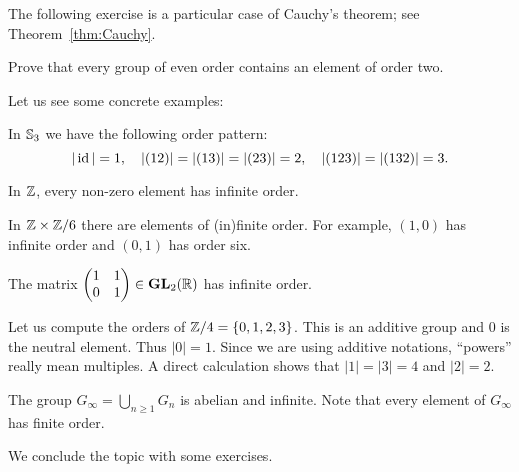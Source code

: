 The following exercise is a particular 
case of Cauchy's theorem; see Theorem~\ref{thm:Cauchy}. 

\begin{exercise}
        \label{xca:orden2}
        Prove that every group of even order contains
        an element of order two. 
\end{exercise}
                
Let us see some concrete examples: 

\begin{example}
        In $\mathbb{S}_3$ we have the following order pattern:
        \[
        |\operatorname{id}|=1,\quad
        |(12)|=|(13)|=|(23)|=2,\quad
        |(123)|=|(132)|=3.
        \]
\end{example}
                        
\begin{example}
        In $\mathbb{Z}$, every non-zero element has 
        infinite order. 
\end{example}
                        
 \begin{example}
        In $\mathbb{Z}\times\mathbb{Z}/6$ there are elements of 
        (in)finite order. For example, $(1,0)$ 
        has infinite order and 
        $(0,1)$ has order six. 
 \end{example}
                        
\begin{example}
        The matrix $\begin{pmatrix}1&1\\0&1\end{pmatrix}\in\mathbf{GL}_2(\mathbb{R})$ has infinite order.
\end{example}                     

\begin{example}
    Let us compute the orders of $\mathbb{Z}/4=\{0,1,2,3\}$. This is an additive group and $0$ is the neutral element. 
    Thus $|0|=1$. Since we are using additive notations, ``powers'' really mean multiples. A direct calculation
    shows that $|1|=|3|=4$ and $|2|=2$. 
\end{example}
                                
\begin{example}
        The group $G_\infty=\bigcup_{n\geq1}G_n$ is abelian and infinite. Note that every element of 
        $G_\infty$ has finite order. 
\end{example}
          
We conclude the topic with some exercises. 

